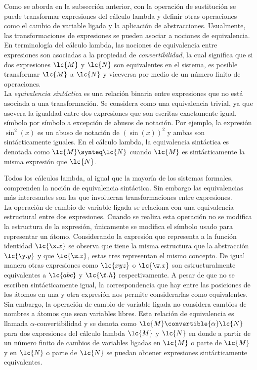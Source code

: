 Como se aborda en la subsección anterior, con la operación de sustitución se puede transformar expresiones del cálculo lambda y definir otras operaciones como el cambio de variable ligada y la aplicación de abstracciones. Usualmente, las transformaciones de expresiones se pueden asociar a nociones de equivalencia. En terminología del cálculo lambda, las nociones de equivalencia entre expresiones son asociadas a la propiedad de \emph{convertibilidad}, la cual significa que si dos expresiones \(\lc{M}\) y \(\lc{N}\) son equivalentes en el sistema, es posible transformar \(\lc{M}\) a \(\lc{N}\) y viceversa por medio de un número finito de operaciones. \\

La \emph{equivalencia sintáctica} es una relación binaria entre expresiones que no está asociada a una transformación. Se considera como una equivalencia trivial, ya que asevera la igualdad entre dos expresiones que son escritas exactamente igual, símbolo por símbolo a excepción de abusos de notación. Por ejemplo, la expresión \(\sin^{2}\left( x \right)\) es un abuso de notación de \(\left( \sin\left( x \right) \right)^{2}\) y ambas son sintácticamente iguales.  En el cálculo lambda, la equivalencia sintáctica es denotada como \(\lc{M} \synteq \lc{N}\) cuando \(\lc{M}\) es sintácticamente la misma expresión que \(\lc{N}\).  \

Todos los cálculos lambda, al igual que la mayoría de los sistemas formales, comprenden la noción de equivalencia sintáctica. Sin embargo las equivalencias más interesantes son las que involucran transformaciones entre expresiones. \\

La operación de cambio de variable ligada se relaciona con una equivalencia estructural entre dos expresiones. Cuando se realiza esta operación no se modifica la estructura de la expresión, únicamente se modifica el símbolo usado para representar un átomo. Considerando la expresión que representa a la función identidad \(\lc{\x.x}\) se observa que tiene la misma estructura que la abstracción \(\lc{\y.y}\) y que \(\lc{\z.z}\), estas tres representan el mismo concepto. De igual manera otras expresiones como \(\lc{x y z}\) o \(\lc{\w.x}\) son estructuralmente equivalentes a \(\lc{a b c}\) y \(\lc{\f.h}\) respectivamente. A pesar de que no se escriben sintácticamente igual, la correspondencia que hay entre las posiciones de los átomos en una y otra expresión nos permite considerarlas como equivalentes. Sin embargo, la operación de cambio de variable ligada no considera cambios de nombres a átomos que sean variables libres. Esta relación de equivalencia es llamada \(\alpha\)-convertibilidad y se denota como \(\lc{M} \convertible{\alpha} \lc{N}\) para dos expresiones del cálculo lambda \(\lc{M}\) y \(\lc{N}\) en donde a partir de un número finito de cambios de variables ligadas en \(\lc{M}\) o parte de \(\lc{M}\) y en \(\lc{N}\) o parte de \(\lc{N}\) se puedan obtener expresiones sintácticamente equivalentes. \\

